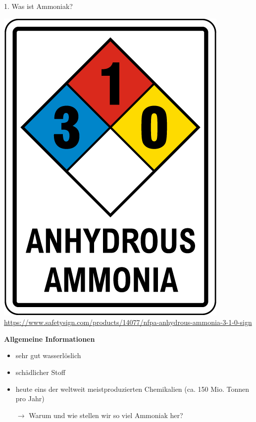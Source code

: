 \documentclass[
    aspectratio=1610
    ]{beamer}
\begin{document}
    \begin{frame}{1. Was ist Ammoniak?}
        \begin{minipage}{4.35cm}
            \includegraphics[scale=.25]{figures/NFPA_Anhydrous_Ammonia.png}
            \tiny\url{https://www.safetysign.com/products/14077/nfpa-anhydrous-ammonia-3-1-0-sign}
        \end{minipage}
        \begin{minipage}{9.5cm}
            \textbf{Allgemeine Informationen}
            \begin{itemize}
                \item sehr gut wasserlöslich                
                \item schädlicher Stoff
                \item heute eins der weltweit meistproduzierten Chemikalien (ca. 150 Mio. Tonnen pro Jahr)
                \item[\alert{$\rightarrow$}] \alert{Warum und wie stellen wir so viel Ammoniak her?}
            \end{itemize}
        \end{minipage}        
    \end{frame}
    
\end{document}
